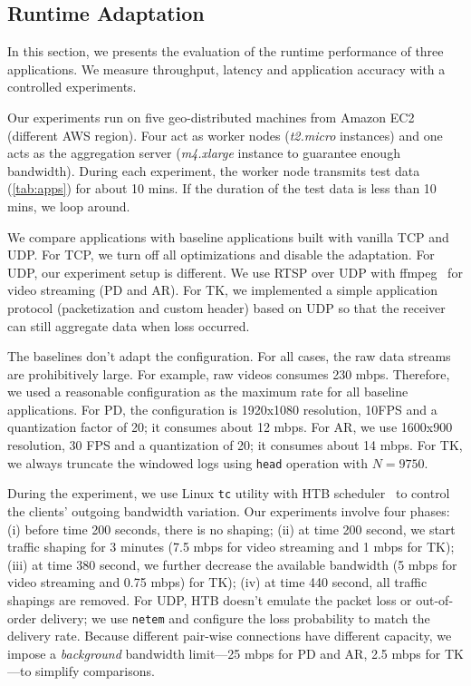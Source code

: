 \newpage

\subsection{Runtime Adaptation}
\label{sec:runtime-adaptation}

In this section, we presents the evaluation of the runtime performance of three
applications. We measure throughput, latency and application accuracy with a
controlled experiments.

Our experiments run on five geo-distributed machines from Amazon EC2 (different
AWS region). Four act as worker nodes (\textit{t2.micro} instances) and one acts
as the aggregation server (\textit{m4.xlarge} instance to guarantee enough
bandwidth). During each experiment, the worker node transmits test data
(\autoref{tab:apps}) for about 10 mins. If the duration of the test data is less
than 10 mins, we loop around.

We compare \sysname{} applications with baseline applications built with vanilla
TCP and UDP. For TCP, we turn off all optimizations and disable the
adaptation. For UDP, our experiment setup is different. We use RTSP over UDP
with ffmpeg~\cite{bellard2012ffmpeg} for video streaming (PD and AR). For TK, we
implemented a simple application protocol (packetization and custom header)
based on UDP so that the receiver can still aggregate data when loss occurred.

The baselines don't adapt the configuration. For all cases, the raw data streams
are prohibitively large. For example, raw videos consumes 230 mbps. Therefore,
we used a reasonable configuration as the maximum rate for all baseline
applications. For PD, the configuration is 1920x1080 resolution, 10FPS and a
quantization factor of 20; it consumes about 12 mbps. For AR, we use 1600x900
resolution, 30 FPS and a quantization of 20; it consumes about 14 mbps. For TK,
we always truncate the windowed logs using \texttt{head} operation with
$N=9750$.

During the experiment, we use Linux \texttt{tc} utility with HTB
scheduler~\cite{lartc, htb} to control the clients' outgoing bandwidth
variation. Our experiments involve four phases: (i) before time 200 seconds,
there is no shaping; (ii) at time 200 second, we start traffic shaping for 3
minutes (7.5 mbps for video streaming and 1 mbps for TK); (iii) at time 380
second, we further decrease the available bandwidth (5 mbps for video streaming
and 0.75 mbps) for TK); (iv) at time 440 second, all traffic shapings are
removed. For UDP, HTB doesn't emulate the packet loss or out-of-order delivery;
we use \texttt{netem} and configure the loss probability to match the delivery
rate. Because different pair-wise connections have different capacity, we impose
a \textit{background} bandwidth limit---25 mbps for PD and AR, 2.5 mbps for
TK---to simplify comparisons.

